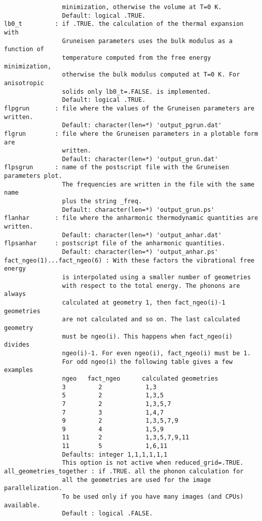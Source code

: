 \documentclass[12pt,a4paper]{article}
\begin{document}
\begin{verbatim}
                minimization, otherwise the volume at T=0 K.
                Default: logical .TRUE.
lb0_t         : if .TRUE. the calculation of the thermal expansion with 
                Gruneisen parameters uses the bulk modulus as a function of 
                temperature computed from the free energy minimization, 
                otherwise the bulk modulus computed at T=0 K. For anisotropic
                solids only lb0_t=.FALSE. is implemented.
                Default: logical .TRUE.
flpgrun       : file where the values of the Gruneisen parameters are written. 
                Default: character(len=*) 'output_pgrun.dat'
flgrun        : file where the Gruneisen parameters in a plotable form are
                written.
                Default: character(len=*) 'output_grun.dat'
flpsgrun      : name of the postscript file with the Gruneisen parameters plot.
                The frequencies are written in the file with the same name 
                plus the string _freq.
                Default: character(len=*) 'output_grun.ps'
flanhar       : file where the anharmonic thermodynamic quantities are written.
                Default: character(len=*) 'output_anhar.dat'
flpsanhar     : postscript file of the anharmonic quantities.
                Default: character(len=*) 'output_anhar.ps'
fact_ngeo(1)...fact_ngeo(6) : With these factors the vibrational free energy 
                is interpolated using a smaller number of geometries 
                with respect to the total energy. The phonons are always 
                calculated at geometry 1, then fact_ngeo(i)-1 geometries 
                are not calculated and so on. The last calculated geometry 
                must be ngeo(i). This happens when fact_ngeo(i) divides
                ngeo(i)-1. For even ngeo(i), fact_ngeo(i) must be 1.
                For odd ngeo(i) the following table gives a few examples
                ngeo   fact_ngeo      calculated geometries
                3         2            1,3
                5         2            1,3,5
                7         2            1,3,5,7
                7         3            1,4,7
                9         2            1,3,5,7,9
                9         4            1,5,9
                11        2            1,3,5,7,9,11
                11        5            1,6,11
                Defaults: integer 1,1,1,1,1,1
                This option is not active when reduced_grid=.TRUE.
all_geometries_together : if .TRUE. all the phonon calculation for
                all the geometries are used for the image parallelization.
                To be used only if you have many images (and CPUs) available.
                Default : logical .FALSE.
\end{verbatim}
\end{document}
